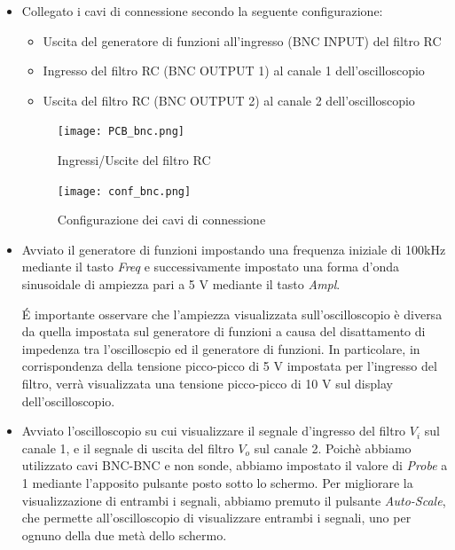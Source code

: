 \begin{itemize}
    \item Collegato i cavi di connessione secondo la seguente configurazione:
    \begin{itemize}
        \item Uscita del generatore di funzioni all'ingresso (BNC INPUT) del filtro RC
        \item Ingresso del filtro RC (BNC OUTPUT 1) al canale 1 dell'oscilloscopio
        \item Uscita del filtro RC (BNC OUTPUT 2) al canale 2 dell'oscilloscopio
    \end{itemize}
    \begin{figure}[h]
        \centering
        \texttt{[image: PCB\_bnc.png]}
        \caption{Ingressi/Uscite del filtro RC}
        \label{fig:pcb_bnc}
    \end{figure}
    \begin{figure}[h]
        \centering
        \texttt{[image: conf\_bnc.png]}
        \caption{Configurazione dei cavi di connessione}
        \label{fig:conf_bnc}
    \end{figure}
    \FloatBarrier

    \item Avviato il generatore di funzioni impostando una frequenza iniziale di 100kHz mediante il tasto \emph{Freq} e successivamente impostato una forma d'onda sinusoidale di ampiezza pari a 5 V mediante il tasto \emph{Ampl}.
    
    \'E importante osservare che l'ampiezza visualizzata sull'oscilloscopio è diversa da quella impostata sul generatore di funzioni a causa del disattamento di impedenza tra l'oscilloscpio ed il generatore di funzioni. In particolare, in corrispondenza della tensione picco-picco di 5 V impostata per l'ingresso del filtro, verrà visualizzata una tensione picco-picco di 10 V sul display dell'oscilloscopio.
    \item Avviato l'oscilloscopio su cui visualizzare il segnale d'ingresso del filtro $V_i$ sul canale 1, e il segnale di uscita del filtro $V_o$ sul canale 2.
    Poichè abbiamo utilizzato cavi BNC-BNC e non sonde, abbiamo impostato il valore di \emph{Probe} a 1 mediante l'apposito pulsante posto sotto lo schermo.
    Per migliorare la visualizzazione di entrambi i segnali, abbiamo premuto il pulsante \emph{Auto-Scale}, che permette all'oscilloscopio di visualizzare entrambi i segnali, uno per ognuno della due metà dello schermo.
    

\end{itemize}
